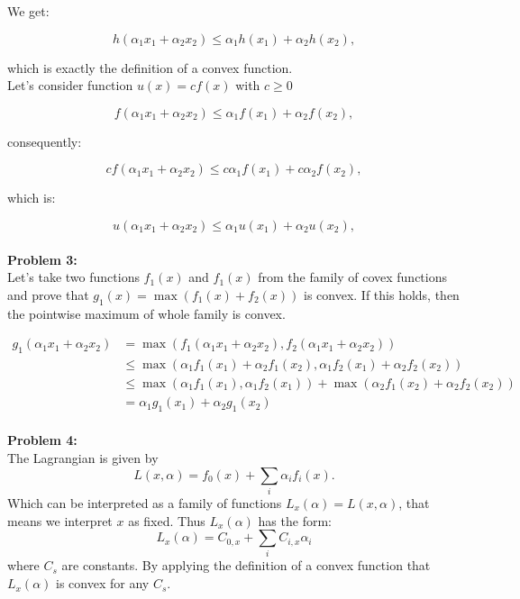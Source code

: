 \documentclass{article}
\begin{document}
We get:

\begin{equation}
h( \alpha_1 x_1 + \alpha_2 x_2 ) \le \alpha_1 h( x_1 ) + \alpha_2 h( x_2 ),
\end{equation}

which is exactly the definition of a convex function.\\
Let's consider function $u(x)=cf(x)$ with $c\ge0$

\begin{equation}
f( \alpha_1 x_1 + \alpha_2 x_2 )   \le    \alpha_1 f( x_1 ) + \alpha_2 f( x_2 ),
\end{equation}

consequently:

\begin{equation}
cf( \alpha_1 x_1 + \alpha_2 x_2 )   \le    c\alpha_1 f( x_1 ) + c\alpha_2 f( x_2 ),
\end{equation}

which is:

\begin{equation}
u( \alpha_1 x_1 + \alpha_2 x_2 )   \le    \alpha_1 u( x_1 ) + \alpha_2 u( x_2 ),
\end{equation}
\\

\setcounter{equation}{0}
\textbf{Problem 3:} \\
Let's take two functions $f_1(x)$ and $f_1(x)$ from the family of covex functions and prove that $g_1(x) = \max(f_1(x) + f_2(x))$ is convex. If this holds, then the pointwise maximum of whole family is convex.

\begin{align} \nonumber
g_1( \alpha_1 x_1 + \alpha_2 x_2 )  &= \max(f_1( \alpha_1 x_1 + \alpha_2 x_2 ), f_2( \alpha_1 x_1 + \alpha_2 x_2 ))\\ \nonumber
&\le \max(\alpha_1 f_1( x_1 ) + \alpha_2 f_1( x_2 ), \alpha_1 f_2( x_1 ) + \alpha_2 f_2( x_2 ))\\ \nonumber
&\le \max(\alpha_1 f_1( x_1 ), \alpha_1 f_2( x_1 )) + \max(\alpha_2 f_1( x_2 ) + \alpha_2 f_2( x_2 ))\\ \nonumber
&= \alpha_1 g_1(x_1) + \alpha_2 g_1(x_2)
\end{align}
\\

\textbf{Problem 4:} \\
The Lagrangian is given by
$$L(x,\alpha) = f_0(x)+\sum_{i}\alpha_if_i(x).$$
Which can be interpreted as a family of functions $L_x(\alpha)=L(x,\alpha)$, that means we interpret $x$ as fixed. Thus $L_x(\alpha)$ has the form:
$$L_x(\alpha)=C_{0,x}+\sum_{i}C_{i,x}\alpha_i$$
where $C_s$ are constants. By applying the definition of a convex function that
$L_x(\alpha)$ is convex for any $C_s$.
\end{document}
